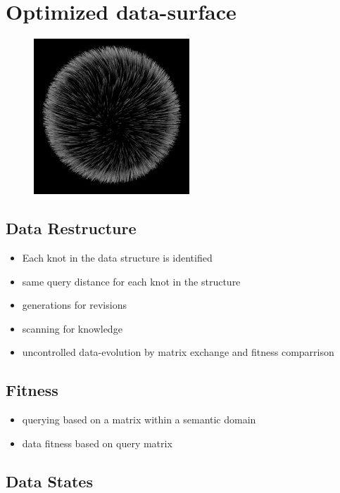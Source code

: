 \documentclass[11pt]{article}
\begin{document}
\section{Optimized data-surface}
\begin{figure}[htp]
\centering
\includegraphics[scale=0.9]{./image/query-surface.jpg}
\end{figure}
\subsection{Data Restructure}

\begin{itemize}
\item Each knot in the data structure is identified
\item same query distance for each knot in the structure
\item generations for revisions
\item scanning for knowledge
\item uncontrolled data-evolution by matrix exchange and 
fitness comparrison
\end{itemize}
\subsection{Fitness}


\begin{itemize}
\item querying based on a matrix within a semantic domain
\item data fitness based on query matrix


\end{itemize}

\subsection{Data States}
\end{document}
